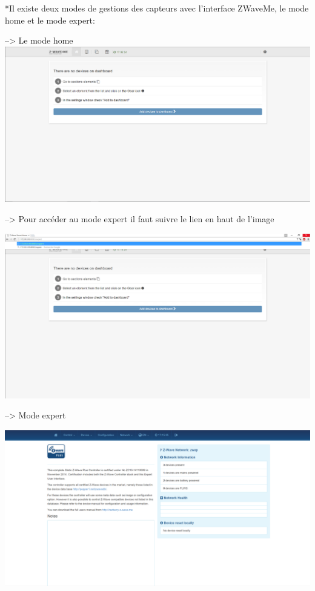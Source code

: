 *Il existe deux modes de gestions des capteurs avec l'interface ZWaveMe, le mode home et le mode expert:


--> Le mode home
\includegraphics[scale=0.5]{./Images/png/home_zwaveme.png}\newline

--> Pour accéder au mode expert il faut suivre le lien en haut de l'image

\includegraphics[scale=0.5]{./Images/png/go_to_zwaveme.png}\newline

--> Mode expert

\includegraphics[scale=0.5]{./Images/png/expert_zwaveme.png}\newline


